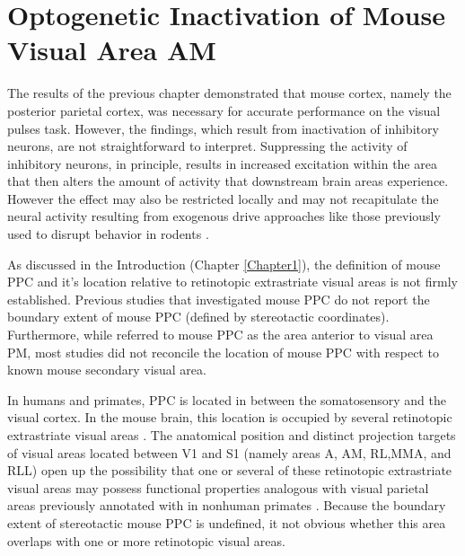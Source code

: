
\chapter{Optogenetic Inactivation of Mouse Visual Area AM} %
\label{Chapter4} 

The results of the previous chapter demonstrated that mouse cortex, namely the posterior parietal cortex, was necessary for accurate performance on the visual pulses task. However, the findings, which result from inactivation of inhibitory neurons, are not straightforward to interpret. Suppressing the activity of inhibitory neurons, in principle, results in increased excitation within the area that then alters the amount of activity that downstream brain areas experience. However the effect may also be restricted locally and may not recapitulate the neural activity resulting from exogenous drive approaches like those previously used to disrupt behavior in rodents \parencite{Otchy2015,Rodgers2014,Licata2017}.\par 

As discussed in the Introduction (Chapter \ref{Chapter1}), the definition of mouse PPC and it's location relative to retinotopic extrastriate visual areas is not firmly established. Previous studies that investigated mouse PPC \parencite{Harvey2012,Marcos2016,Funamizu2016,Goard2016,Jeong2017} do not report the boundary extent of mouse PPC (defined by stereotactic coordinates). Furthermore, while \textcite{Funamizu2016} referred to mouse PPC as the area anterior to visual area PM, most studies did not reconcile the location of mouse PPC with respect to known mouse secondary visual area. \par

In humans and primates, PPC is located in between the somatosensory and the visual cortex. In the mouse brain, this location is occupied by several retinotopic extrastriate visual areas \parencite{Wang2007,Zhuang2017}. The anatomical position and distinct projection targets of visual areas located between V1 and S1 (namely areas A, AM, RL,MMA, and RLL) open up the possibility that one or several of these retinotopic extrastriate visual areas may possess functional properties analogous with visual parietal areas previously annotated with in nonhuman primates \parencite{Cavada1993}. Because the boundary extent of stereotactic mouse PPC \parencite{Harvey2012} is undefined, it not obvious whether this area overlaps with one or more retinotopic visual areas. \par 

